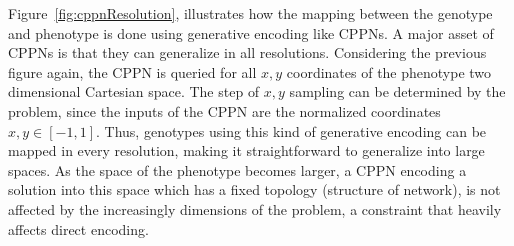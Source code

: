 Figure~\ref{fig:cppnResolution}, illustrates how the mapping between the genotype and phenotype is done using generative encoding like CPPNs. A major asset of CPPNs is that they can generalize in all resolutions. Considering the previous figure again, the CPPN is queried for all $x,y$ coordinates of the phenotype two dimensional Cartesian space. The step of $x,y$ sampling can be determined by the problem, since the inputs of the CPPN are the normalized coordinates $x,y \in [-1,1]$. Thus, genotypes using this kind of generative encoding can be mapped in every resolution, making it straightforward to generalize into large spaces. As the space of the phenotype becomes larger, a CPPN encoding a solution into this space which has a fixed topology (structure of network), is not affected by the increasingly dimensions of the problem, a constraint that heavily affects direct encoding.

